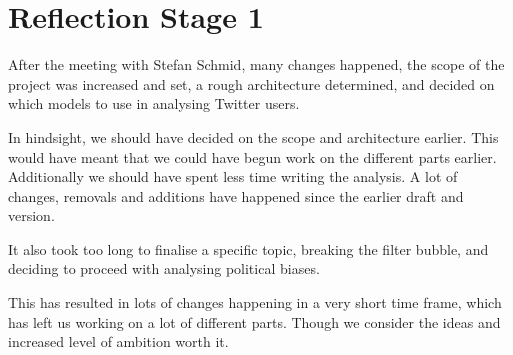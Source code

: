 \section{Reflection Stage 1}
After the meeting with Stefan Schmid, many changes happened, the scope of the
project was increased and set, a rough architecture determined, and decided on which
models to use in analysing Twitter users.\nl

In hindsight, we should have decided on the scope and architecture earlier. This
would have meant that we could have begun work on the different parts earlier.
Additionally we should have spent less time writing the analysis. A lot of
changes, removals and additions have happened since the earlier draft and
version.\nl

It also took too long to finalise a specific topic, breaking the
filter bubble, and deciding to proceed with analysing political biases.\nl

This has resulted in lots of changes happening in a very short time frame,
which has left us working on a lot of different parts. Though we consider the
ideas and increased level of ambition worth it.